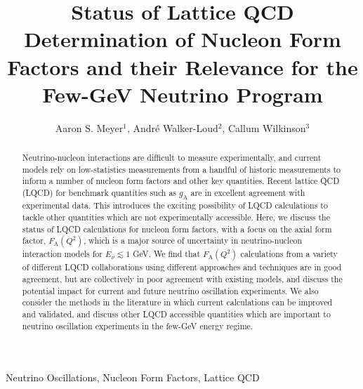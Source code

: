 \documentclass{ar-1col}
\begin{document}

\title{Status of Lattice QCD Determination of Nucleon Form Factors
 and their Relevance for the Few-GeV Neutrino Program}

\author{Aaron S. Meyer$^1$,
Andr\'{e} Walker-Loud$^2$,
Callum Wilkinson$^3$
}

\begin{abstract}
  Neutrino-nucleon interactions are difficult to measure experimentally, and current models rely on low-statistics measurements from a handful of historic measurements to inform a number of nucleon form factors and other key quantities.
  Recent lattice QCD (LQCD) for benchmark quantities such as $g_{\mathrm{A}}$ are in excellent agreement with experimental data.
  This introduces the exciting possibility of LQCD calculations to tackle other quantities which are not experimentally accessible.
  Here, we discuss the status of LQCD calculations for nucleon form factors, with a focus on the axial form factor, $F_{\mathrm{A}}(Q^2)$, which is a major source of uncertainty in neutrino-nucleon interaction models for $E_{\nu} \lesssim 1$ GeV.
  We find that $F_{\mathrm{A}}(Q^2)$ calculations from a variety of different LQCD collaborations using different approaches and techniques are in good agreement, but are collectively in poor agreement with existing models, and discuss the potential impact for current and future neutrino oscillation experiments.
  We also consider the methods in the literature in which current calculations can be improved and validated, and discuss other LQCD accessible quantities which are important to neutrino oscillation experiments in the few-GeV energy regime.
\end{abstract}

\begin{keywords}
Neutrino Oscillations, Nucleon Form Factors, Lattice QCD
\end{keywords}

\maketitle
\end{document}
